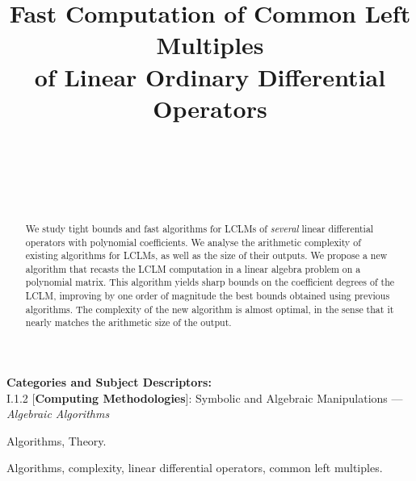 \documentclass{sig-alt-full}
\begin{document}
\title{Fast Computation of Common Left Multiples \\
of Linear Ordinary Differential Operators}
\def\more-auths{\end{tabular}
\begin{tabular}{c}}
\author{
\\
\\
\\
\\
}

\maketitle
\begin{abstract}
We study tight bounds and fast algorithms
for LCLMs of 
\emph{several\/} 
linear differential operators with polynomial coefficients. We analyse the
arithmetic complexity of existing algorithms for LCLMs, as well as the size of
their outputs. We propose a new algorithm that recasts the LCLM computation in
a linear algebra problem on a polynomial matrix. This algorithm yields sharp
bounds on the coefficient degrees of the LCLM, improving by one order of
magnitude the best bounds obtained using previous algorithms. The complexity
of the new algorithm is almost optimal, in the sense that it nearly matches
the arithmetic size of the output. \end{abstract}

\vspace{1mm}
\noindent
{\bf Categories and Subject Descriptors:} \\
\noindent I.1.2 [{\bf Computing Methodologies}]: Symbolic and
Algebraic Manipulations --- \emph{Algebraic Algorithms}

\vspace{1mm}
 Algorithms, Theory.

\vspace{1mm}
 Algorithms, complexity, linear differential operators, common left multiples.
\end{document}
